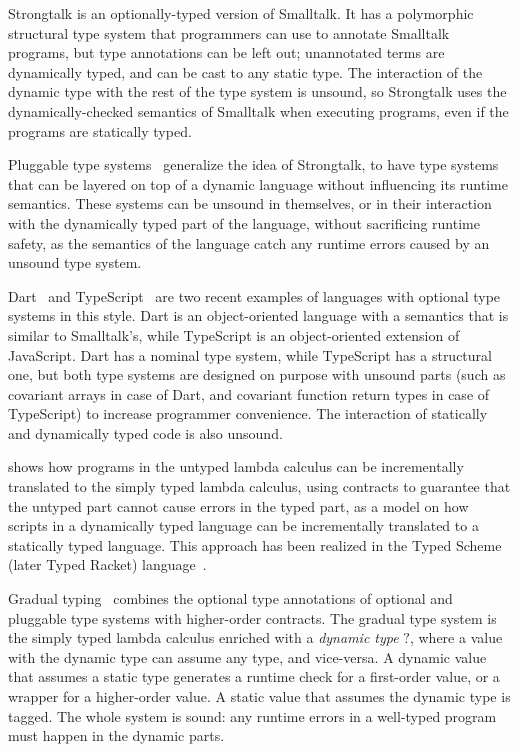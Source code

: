\documentclass[preprint]{sig-alternate}
\begin{document}
Strongtalk \citep{bracha1993strongtalk,bracha1996strongtalk} is
an optionally-typed version of Smalltalk. It has a
polymorphic structural type system that programmers can use
to annotate Smalltalk programs, but type annotations can be
left out; unannotated terms are dynamically typed, and can
be cast to any static type. The interaction of the dynamic
type with the rest of the type system is unsound, so
Strongtalk uses the dynamically-checked semantics of
Smalltalk when executing programs, even if the programs
are statically typed.

Pluggable type systems~\citep{bracha2004pluggable} generalize
the idea of Strongtalk, to have type systems that can be
layered on top of a dynamic language without influencing
its runtime semantics. These systems can be unsound in
themselves, or in their interaction with the dynamically
typed part of the language, without sacrificing runtime
safety, as the semantics of the language catch any
runtime errors caused by an unsound type system.

Dart~\citep{dart} and TypeScript~\citep{typescript} are
two recent examples of languages with optional type systems
in this style. Dart is an object-oriented language with
a semantics that is similar to Smalltalk's, while TypeScript
is an object-oriented extension of JavaScript. Dart has a
nominal type system, while TypeScript has a structural one,
but both type systems are designed on purpose with unsound
parts (such as covariant arrays in case of Dart, and
covariant function return types in case of TypeScript) to
increase programmer convenience. The interaction of
statically and dynamically typed code is also unsound.

\citep{tobin-hochstadt2006ims} shows how programs
in the untyped lambda calculus can be incrementally
translated to the simply typed lambda calculus, using
contracts to guarantee that the untyped part cannot
cause errors in the typed part, as a model on how
scripts in a dynamically typed language can be
incrementally translated to a statically typed
language. This approach has been realized in the
Typed Scheme (later Typed Racket) language~\citet{tobin-hochstadt2008ts}. 

Gradual typing~\citep{siek2006gradual} combines the
optional type annotations of optional and pluggable
type systems with higher-order contracts. The gradual
type system is the simply typed lambda calculus enriched
with a {\em dynamic type} $?$, where a value with the
dynamic type can assume any type, and vice-versa.
A dynamic value that assumes a static type generates
a runtime check for a first-order value, or a wrapper
for a higher-order value. A static value that assumes
the dynamic type is tagged. The whole system is sound:
any runtime errors in a well-typed program must happen
in the dynamic parts. 
\end{document}
